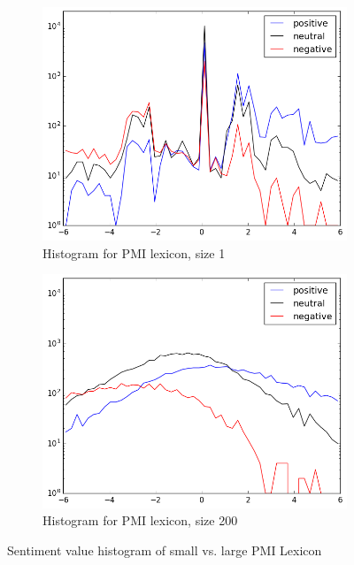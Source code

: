 \begin{figure}[t]
    \centering
    \begin{subfigure}[b]{0.49\textwidth}
        \includegraphics[width=\textwidth]{./figs/distrib/1500}
        \caption{Histogram for PMI lexicon, size 1}
        \label{fig:distrib_1500}
    \end{subfigure}
    \begin{subfigure}[b]{0.49\textwidth}
        \includegraphics[width=\textwidth]{./figs/distrib/200000}
        \caption{Histogram for PMI lexicon, size 200}
        \label{fig:distrib_200000}
    \end{subfigure}
    \caption{Sentiment value histogram of small vs. large PMI Lexicon}
    \label{fig:distrib_size_comparison}
\end{figure}

